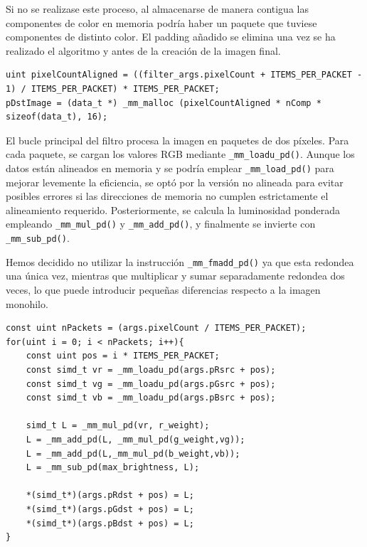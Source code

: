 \documentclass[11pt,a4paper]{article}
\begin{document}
\noindent Si no se realizase este proceso, al almacenarse de manera contigua las componentes de color en memoria podría haber un paquete que tuviese componentes de distinto color. El padding añadido se elimina una vez se ha realizado el algoritmo y antes de la creación de la imagen final.
\begin{lstlisting}[style=cppStyle]
uint pixelCountAligned = ((filter_args.pixelCount + ITEMS_PER_PACKET - 1) / ITEMS_PER_PACKET) * ITEMS_PER_PACKET;
pDstImage = (data_t *) _mm_malloc (pixelCountAligned * nComp * sizeof(data_t), 16);
\end{lstlisting}
 
\vspace{1ex}
\noindent El bucle principal del filtro procesa la imagen en paquetes de dos píxeles. Para cada paquete, 
se cargan los valores RGB mediante \texttt{\_mm\_loadu\_pd()}. Aunque los datos están alineados en memoria 
y se podría emplear \texttt{\_mm\_load\_pd()} para mejorar levemente la eficiencia, se optó por la versión no alineada 
para evitar posibles errores si las direcciones de memoria no 
cumplen estrictamente el alineamiento requerido. Posteriormente, se calcula la luminosidad 
ponderada empleando \texttt{\_mm\_mul\_pd()} y \texttt{\_mm\_add\_pd()}, y 
finalmente se invierte con \texttt{\_mm\_sub\_pd()}.
\vspace{1ex}

\noindent Hemos decidido no utilizar la instrucción
 \texttt{\_mm\_fmadd\_pd()} ya que esta redondea una única vez, mientras que multiplicar y sumar 
separadamente redondea dos veces, lo que puede introducir pequeñas diferencias respecto a la imagen monohilo. 
\begin{lstlisting}[style=cppStyle]
const uint nPackets = (args.pixelCount / ITEMS_PER_PACKET);
for(uint i = 0; i < nPackets; i++){
	const uint pos = i * ITEMS_PER_PACKET;
	const simd_t vr = _mm_loadu_pd(args.pRsrc + pos);
	const simd_t vg = _mm_loadu_pd(args.pGsrc + pos);
	const simd_t vb = _mm_loadu_pd(args.pBsrc + pos);

	simd_t L = _mm_mul_pd(vr, r_weight);
	L = _mm_add_pd(L, _mm_mul_pd(g_weight,vg));
	L = _mm_add_pd(L,_mm_mul_pd(b_weight,vb));
	L = _mm_sub_pd(max_brightness, L);

	*(simd_t*)(args.pRdst + pos) = L;
	*(simd_t*)(args.pGdst + pos) = L;
	*(simd_t*)(args.pBdst + pos) = L;
}
\end{lstlisting}
\end{document}
